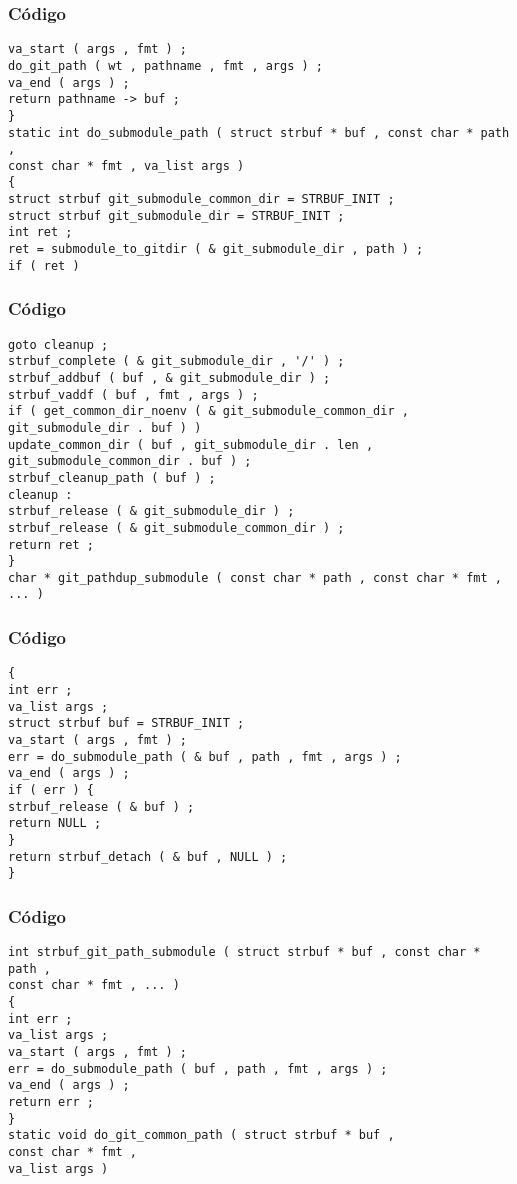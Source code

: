 \documentclass{beamer}
\begin{document}
\begin{frame}[fragile]
\frametitle{C\'odigo}
\begin{verbatim}
va_start ( args , fmt ) ; 
do_git_path ( wt , pathname , fmt , args ) ; 
va_end ( args ) ; 
return pathname -> buf ; 
} 
static int do_submodule_path ( struct strbuf * buf , const char * path , 
const char * fmt , va_list args ) 
{ 
struct strbuf git_submodule_common_dir = STRBUF_INIT ; 
struct strbuf git_submodule_dir = STRBUF_INIT ; 
int ret ; 
ret = submodule_to_gitdir ( & git_submodule_dir , path ) ; 
if ( ret ) 
\end{verbatim}
\end{frame}
\begin{frame}[fragile]
\frametitle{C\'odigo}
\begin{verbatim}
goto cleanup ; 
strbuf_complete ( & git_submodule_dir , '/' ) ; 
strbuf_addbuf ( buf , & git_submodule_dir ) ; 
strbuf_vaddf ( buf , fmt , args ) ; 
if ( get_common_dir_noenv ( & git_submodule_common_dir , git_submodule_dir . buf ) ) 
update_common_dir ( buf , git_submodule_dir . len , git_submodule_common_dir . buf ) ; 
strbuf_cleanup_path ( buf ) ; 
cleanup : 
strbuf_release ( & git_submodule_dir ) ; 
strbuf_release ( & git_submodule_common_dir ) ; 
return ret ; 
} 
char * git_pathdup_submodule ( const char * path , const char * fmt , ... ) 
\end{verbatim}
\end{frame}
\begin{frame}[fragile]
\frametitle{C\'odigo}
\begin{verbatim}
{ 
int err ; 
va_list args ; 
struct strbuf buf = STRBUF_INIT ; 
va_start ( args , fmt ) ; 
err = do_submodule_path ( & buf , path , fmt , args ) ; 
va_end ( args ) ; 
if ( err ) { 
strbuf_release ( & buf ) ; 
return NULL ; 
} 
return strbuf_detach ( & buf , NULL ) ; 
} 
\end{verbatim}
\end{frame}
\begin{frame}[fragile]
\frametitle{C\'odigo}
\begin{verbatim}
int strbuf_git_path_submodule ( struct strbuf * buf , const char * path , 
const char * fmt , ... ) 
{ 
int err ; 
va_list args ; 
va_start ( args , fmt ) ; 
err = do_submodule_path ( buf , path , fmt , args ) ; 
va_end ( args ) ; 
return err ; 
} 
static void do_git_common_path ( struct strbuf * buf , 
const char * fmt , 
va_list args ) 
\end{verbatim}
\end{frame}
\end{document}
